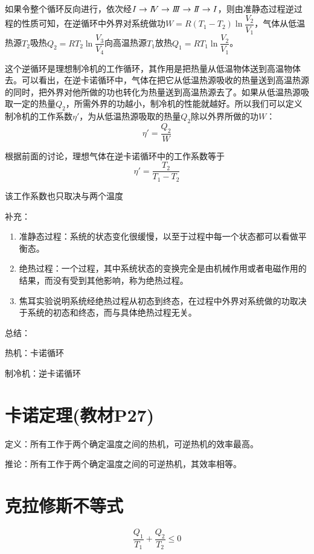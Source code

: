 \documentclass[oneside]{ctexbook}
\begin{document}
如果令整个循环反向进行，依次经\(I\to I\hspace{-0.08cm}V\to I\hspace{-0.1cm}I\hspace{-0.1cm}I\to I\hspace{-0.1cm}I\to I\)，则由准静态过程逆过程的性质可知，在逆循环中外界对系统做功\(W=R(T_1-T_2)\ln\dfrac{V_2}{V_1}\)，气体从低温热源\(T_2\)吸热\(Q_2=RT_2\ln\dfrac{V_3}{V_4}\)向高温热源\(T_1\)放热\(Q_1=RT_1\ln\dfrac{V_2}{V_1}\)。

这个逆循环是理想制冷机的工作循环，其作用是把热量从低温物体送到高温物体去。可以看出，在逆卡诺循环中，气体在把它从低温热源吸收的热量送到高温热源的同时，把外界对他所做的功也转化为热量送到高温热源去了。如果从低温热源吸取一定的热量\(Q_2\)，所需外界的功越小，制冷机的性能就越好。所以我们可以定义制冷机的工作系数\(\eta{}'\)，为从低温热源吸取的热量\(Q_2\)除以外界所做的功\(W\)：
\begin{equation}
\eta{}'=\dfrac{Q_2}{W}
\end{equation}

根据前面的讨论，理想气体在逆卡诺循环中的工作系数等于
\begin{equation}
\eta{}'=\dfrac{T_2}{T_1-T_2}
\end{equation}

该工作系数也只取决与两个温度

补充：
\begin{enumerate}
    \item 准静态过程：系统的状态变化很缓慢，以至于过程中每一个状态都可以看做平衡态。
    \item 绝热过程：一个过程，其中系统状态的变换完全是由机械作用或者电磁作用的结果，而没有受到其他影响，称为绝热过程。
    \item 焦耳实验说明系统经绝热过程从初态到终态，在过程中外界对系统做的功取决于系统的初态和终态，而与具体绝热过程无关。
\end{enumerate}

总结：

热机：卡诺循环

制冷机：逆卡诺循环

\section{卡诺定理(教材P27)}

定义：所有工作于两个确定温度之间的热机，可逆热机的效率最高。

推论：所有工作于两个确定温度之间的可逆热机，其效率相等。

\section{克拉修斯不等式}
\begin{equation}
\dfrac{Q_1}{T_1}+\dfrac{Q_2}{T_2}\leq{}0
\end{equation}
\end{document}
